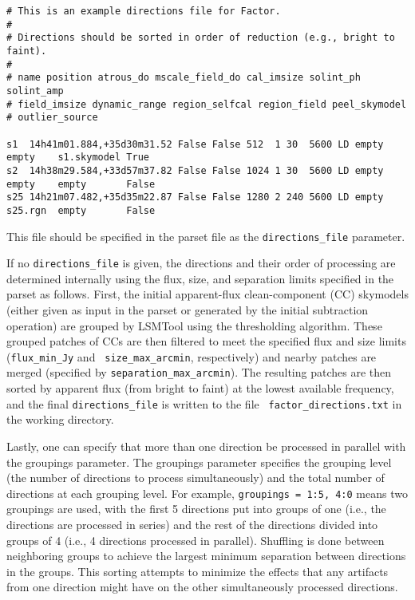 \documentclass[structabstract]{article}
\begin{document}
\begin{verbatim}
# This is an example directions file for Factor.
#
# Directions should be sorted in order of reduction (e.g., bright to faint).
#
# name position atrous_do mscale_field_do cal_imsize solint_ph solint_amp
# field_imsize dynamic_range region_selfcal region_field peel_skymodel
# outlier_source

s1  14h41m01.884,+35d30m31.52 False False 512  1 30  5600 LD empty empty    s1.skymodel True
s2  14h38m29.584,+33d57m37.82 False False 1024 1 30  5600 LD empty empty    empty       False
s25 14h21m07.482,+35d35m22.87 False False 1280 2 240 5600 LD empty s25.rgn  empty       False
\end{verbatim}
This file should be specified in the parset file as the {\tt directions\_file}
parameter.

If no {\tt directions\_file} is given, the directions and their order of
processing are determined internally using the flux, size, and separation limits
specified in the parset as follows. First, the initial apparent-flux
clean-component (CC) skymodels (either given as input in the parset or generated
by the initial subtraction operation) are grouped by LSMTool using the
thresholding algorithm. These grouped patches of CCs are then filtered to meet
the specified flux and size limits ({\tt flux\_min\_Jy} and {\tt
size\_max\_arcmin}, respectively) and nearby patches are merged (specified by
{\tt separation\_max\_arcmin}). The resulting patches are then sorted by
apparent flux (from bright to faint) at the lowest available frequency, and the
final {\tt directions\_file} is written to the file {\tt
factor\_directions.txt} in the working directory.

Lastly, one can specify that more than one direction be processed in parallel
with the groupings parameter. The groupings parameter specifies the grouping
level (the number of directions to process simultaneously) and the total number
of directions at each grouping level. For example, {\tt groupings = 1:5, 4:0}
means two groupings are used, with the first 5 directions put into groups of one
(i.e., the directions are processed in series) and the rest of the directions
divided into groups of 4 (i.e., 4 directions processed in parallel). Shuffling
is done between neighboring groups to achieve the largest minimum separation
between directions in the groups. This sorting attempts to minimize the effects
that any artifacts from one direction might have on the other simultaneously
processed directions.
\end{document}
